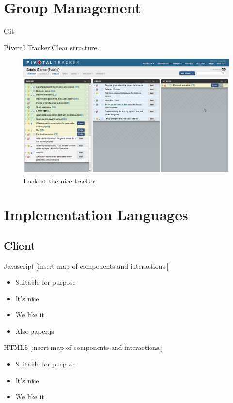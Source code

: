 \documentclass{beamer}
\begin{document}
\section{Group Management}

\begin{frame}{Git}
\end{frame}

\begin{frame}{Pivotal Tracker}
  Clear structure.\\
  \begin{figure}[hb]
    \centering
    \includegraphics[scale=0.2]{pivotal.png}
    \caption{Look at the nice tracker}
  \end{figure}
\end{frame}


\section{Implementation Languages}
\subsection{Client}

\begin{frame}{Javascript}
  [insert map of components and interactions.]
  \begin{itemize}
    \item Suitable for purpose
    \item It's nice
    \item We like it
    \item Also paper.js
  \end{itemize}
\end{frame}

\begin{frame}{HTML5}
  [insert map of components and interactions.]
  \begin{itemize}
    \item Suitable for purpose
    \item It's nice
    \item We like it
  \end{itemize}
\end{frame}
\end{document}
